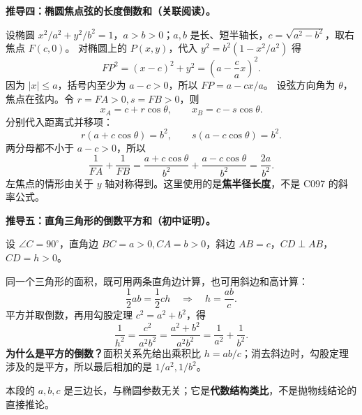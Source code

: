 \clearpage
\begin{proofbox}
\textbf{推导四：椭圆焦点弦的长度倒数和（关联阅读）。}
\begin{center}\end{center}
设椭圆 $x^2/a^2+y^2/b^2=1$，$a>b>0$；$a,b$ 是长、短半轴长，$c=\sqrt{a^2-b^2}$，取右焦点 $F(c,0)$。
对椭圆上的 $P(x,y)$，代入 $y^2=b^2(1-x^2/a^2)$ 得
\[
FP^2=(x-c)^2+y^2=\left(a-\frac ca x\right)^2.
\]
因为 $|x|\le a$，括号内至少为 $a-c>0$，所以 $FP=a-cx/a$。
设弦方向角为 $\theta$，焦点在弦内。令 $r=FA>0,s=FB>0$，则
\[
x_A=c+r\cos\theta,\qquad x_B=c-s\cos\theta.
\]
分别代入距离式并移项：
\[
r(a+c\cos\theta)=b^2,\qquad s(a-c\cos\theta)=b^2.
\]
两分母都不小于 $a-c>0$，所以
\[
\frac1{FA}+\frac1{FB}
=\frac{a+c\cos\theta}{b^2}+\frac{a-c\cos\theta}{b^2}
=\boxed{\frac{2a}{b^2}}.
\]
左焦点的情形由关于 $y$ 轴对称得到。这里使用的是\textbf{焦半径长度}，不是 C097 的斜率公式。
\end{proofbox}

\clearpage
\begin{proofbox}
\textbf{推导五：直角三角形的倒数平方和（初中证明）。}
\begin{center}\end{center}
设 $\angle C=90^\circ$，直角边 $BC=a>0,CA=b>0$，斜边 $AB=c$，$CD\perp AB$，$CD=h>0$。

同一个三角形的面积，既可用两条直角边计算，也可用斜边和高计算：
\[
\frac12ab=\frac12ch\quad\Longrightarrow\quad h=\frac{ab}{c}.
\]
平方并取倒数，再用勾股定理 $c^2=a^2+b^2$，得
\[
\frac1{h^2}=\frac{c^2}{a^2b^2}
=\frac{a^2+b^2}{a^2b^2}
=\boxed{\frac1{a^2}+\frac1{b^2}}.
\]
\textbf{为什么是平方的倒数？}面积关系先给出乘积比 $h=ab/c$；消去斜边时，勾股定理涉及的是平方，所以最后相加的是 $1/a^2,1/b^2$。

本段的 $a,b,c$ 是三边长，与椭圆参数无关；它是\textbf{代数结构类比}，不是抛物线结论的直接推论。
\end{proofbox}
